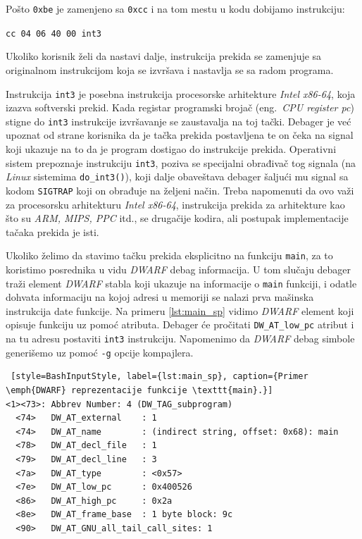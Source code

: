 \documentclass[12pt,oneside]{memoir}
\begin{document}
Pošto \texttt{0xbe} je zamenjeno sa \texttt{0xcc} i na tom mestu u kodu dobijamo instrukciju:

\texttt{cc 04 06 40 00  int3}

Ukoliko korisnik želi da nastavi dalje, instrukcija prekida se zamenjuje sa originalnom instrukcijom koja se izvršava i nastavlja se sa radom programa.

Instrukcija \texttt{int3} je posebna instrukcija procesorske arhitekture \emph{Intel x86-64}, koja izazva softverski prekid. Kada registar programski brojač (eng.~\emph{CPU register pc}) stigne do \texttt{int3} instrukcije izvršavanje se zaustavalja na toj tački. Debager je već upoznat od strane korisnika da je tačka prekida postavljena te on čeka na signal koji ukazuje na to da je program dostigao do instrukcije prekida. Operativni sistem prepoznaje instrukciju \texttt{int3}, poziva se specijalni obrađivač tog signala (na \emph{Linux} sistemima \texttt{do\_int3()}), koji dalje obaveštava debager šaljući mu signal sa kodom \texttt{SIGTRAP} koji on obrađuje na željeni način. Treba napomenuti da ovo važi za procesorsku arhitekturu \emph{Intel x86-64}, instrukcija prekida za arhitekture kao što su \emph{ARM, MIPS, PPC} itd., se drugačije kodira, ali postupak implementacije tačaka prekida je isti.

Ukoliko želimo da stavimo tačku prekida eksplicitno na funkciju \texttt{main}, za to koristimo posrednika u vidu \emph{DWARF} debag informacija. U tom slučaju debager traži element \emph{DWARF} stabla koji ukazuje na informacije o \texttt{main} funkciji, i odatle dohvata informaciju na kojoj adresi u memoriji se nalazi prva mašinska instrukcija date funkcije. Na primeru \ref{lst:main_sp} vidimo \emph{DWARF} element koji opisuje funkciju uz pomoć atributa. Debager će pročitati \texttt{DW\_AT\_low\_pc} atribut i na tu adresu postaviti \texttt{int3} instrukciju. Napomenimo da \emph{DWARF} debag simbole generišemo uz pomoć \texttt{-g} opcije kompajlera.
\newpage
\begin{lstlisting} [style=BashInputStyle, label={lst:main_sp}, caption={Primer \emph{DWARF} reprezentacije funkcije \texttt{main}.}]
<1><73>: Abbrev Number: 4 (DW_TAG_subprogram)
  <74>   DW_AT_external    : 1
  <74>   DW_AT_name        : (indirect string, offset: 0x68): main
  <78>   DW_AT_decl_file   : 1
  <79>   DW_AT_decl_line   : 3
  <7a>   DW_AT_type        : <0x57>
  <7e>   DW_AT_low_pc      : 0x400526
  <86>   DW_AT_high_pc     : 0x2a
  <8e>   DW_AT_frame_base  : 1 byte block: 9c
  <90>   DW_AT_GNU_all_tail_call_sites: 1
\end{lstlisting}
\end{document}
